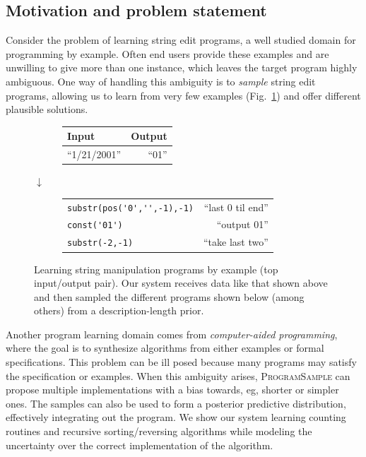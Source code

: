 \documentclass{article}
\newcommand{\theSystem}{\textsc{ProgramSample}}
\begin{document}
\subsection{Motivation and problem statement}


Consider the problem of learning string edit programs, a well studied domain for programming by example.
Often end users provide these examples and are unwilling to give more than one instance,
which leaves the target program highly ambiguous.
One way of handling this ambiguity is to \emph{sample} string edit programs,
allowing us to learn from very few examples (Fig.~\ref{ambiguous})
and offer different plausible solutions.
\begin{figure}
  \centering
  \begin{subfigure}
    \centering
    \begin{tabular}{lr}
      \toprule
      Input & Output \\
      \midrule
      ``1/21/2001'' & ``01''
      \bottomrule
    \end{tabular}
  \end{subfigure}%

  $\downarrow$ ~%
  \begin{subfigure}
    \centering
    \begin{tabular}{|lr|}
      \toprule
      \verb|substr(pos('0','',-1),-1)| & ``last 0 til end'' \\
      \verb|const('01')|       & ``output 01''\\
      \verb|substr(-2,-1)| & ``take last two''
      \bottomrule
    \end{tabular}
  \end{subfigure}
  \caption{Learning string manipulation programs by example (top input/output pair). Our system receives data like that shown above and then sampled the different programs shown below (among others) from a description-length prior.}
  \label{ambiguous}
\end{figure}

Another program learning domain comes from \emph{computer-aided programming}, where the goal is to synthesize algorithms from
either examples or formal specifications.
This problem can be ill posed because many programs may satisfy the specification or examples.
When this ambiguity arises,
\theSystem{} can propose multiple implementations with a bias towards, eg, shorter or simpler ones.
The samples can also be used to form a posterior predictive distribution, effectively integrating out the program.
We show our system  learning counting routines and recursive sorting/reversing algorithms
while modeling the uncertainty over the correct implementation of the algorithm.
\end{document}
